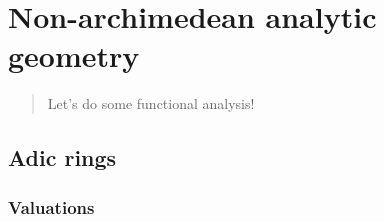 \chapter{Non-archimedean analytic geometry} \label{chapter: valuations} 
    \begin{abstract}
        Let's do some functional analysis!
    \end{abstract}
    
    \minitoc
    
    
    
    \section{Adic rings}
        \subsection{Valuations}
